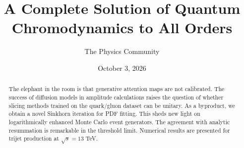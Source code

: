\documentclass[11pt]{article}
\title{A Complete Solution of Quantum Chromodynamics to All Orders}
\author{The Physics Community}
\date{October 3, 2026}
\begin{document}
\maketitle
\begin{abstract}
The elephant in the room is that generative attention maps are not
calibrated. The success of diffusion models in amplitude calculations
raises the question of whether slicing methods trained on the
quark/gluon dataset can be unitary. As a byproduct, we obtain a novel
Sinkhorn iteration for PDF fitting. This sheds new light on
logarithmically enhanced Monte Carlo event generators. The agreement
with analytic resummation is remarkable in the threshold limit.
Numerical results are presented for trijet production at $\sqrt{s} = 13$
TeV.
\end{abstract}
\tableofcontents



\nocite{*}


\end{document}

